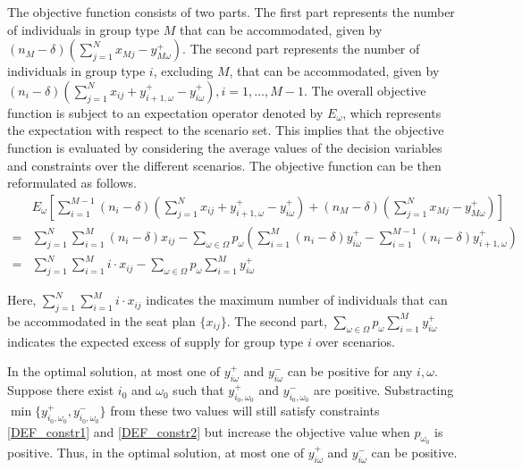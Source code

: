 The objective function consists of two parts. The first part represents the number of individuals in
group type $M$ that can be accommodated, given by $(n_{M}-\delta) (\sum_{j=1}^{N} x_{Mj} - y_{M\omega}^{+})$. The second part represents the number of individuals in group type $i$, excluding $M$, that can be accommodated, given by $(n_i-\delta) (\sum_{j=1}^{N} x_{ij} + y_{i+1,\omega}^{+} - y_{i\omega}^{+}), i = 1, \ldots, M-1$. The overall objective function is subject to an expectation operator denoted by $E_{\omega}$, which represents the expectation with respect to the scenario set. This implies that the objective function is evaluated by considering the average values of the decision variables and constraints over the different scenarios. The objective function can be then reformulated as follows.
\begin{align*}
  & E_{\omega}\left[\sum_{i=1}^{M-1} (n_i-\delta) (\sum_{j= 1}^{N} x_{ij} + y_{i+1,\omega}^{+} - y_{i \omega}^{+}) + (n_M-\delta) (\sum_{j= 1}^{N} x_{Mj} - y_{M \omega}^{+})\right] \\
  = & \sum_{j =1}^{N} \sum_{i=1}^M (n_i- \delta) x_{ij} - \sum_{\omega \in \Omega} p_{\omega} \left(\sum_{i=1}^{M}(n_i- \delta)y_{i \omega}^{+} - \sum_{i=1}^{M-1}(n_i-\delta)y_{i+1, \omega}^{+}\right) \\
  = & \sum_{j =1}^{N} \sum_{i=1}^M i \cdot x_{ij} - \sum_{\omega \in \Omega} p_{\omega} \sum_{i = 1}^{M} y_{i \omega}^{+}
\end{align*}

Here, $\sum_{j =1}^{N} \sum_{i=1}^M i \cdot x_{ij}$ indicates the maximum number of individuals that can be accommodated in the seat plan $\{x_{ij}\}$. The second part, $\sum_{\omega \in \Omega} p_{\omega} \sum_{i = 1}^{M} y_{i \omega}^{+}$ indicates the expected excess of supply for group type $i$ over scenarios.

In the optimal solution, at most one of $y_{i \omega}^{+}$ and $y_{i \omega}^{-}$ can be positive for any $i, \omega$. Suppose there exist $i_0$ and $\omega_0$ such that $y_{i_0, \omega_0}^{+}$ and $y_{i_0, \omega_0}^{-}$ are positive. Substracting $\min\{y_{i_0, \omega_0}^{+}, y_{i_0, \omega_0}^{-}\}$ from these two values will still satisfy constraints \eqref{DEF_constr1} and \eqref{DEF_constr2} but increase the objective value when $p_{\omega_0}$ is positive. Thus, in the optimal solution, at most one of $y_{i \omega}^{+}$ and $y_{i \omega}^{-}$ can be positive.


